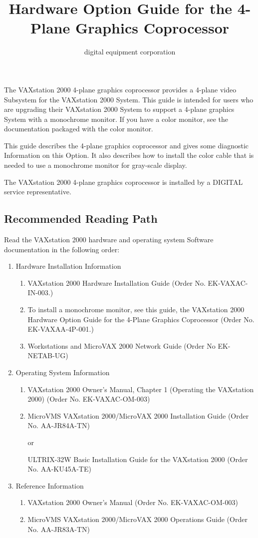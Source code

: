 \documentclass{dec}
\title{Hardware Option Guide for the 4-Plane Graphics Coprocessor}
\author{digital equipment corporation}
\begin{document}
\maketitle

\toc

\newpage
{}
\thispagestyle{preface}
The VAXstation 2000 4-plane graphics coprocessor provides a 4-plane video
Subsystem for the VAXstation 2000 System. This guide is intended for
users who are upgrading their VAXstation 2000 System to support a 4-plane
graphics System with a monochrome monitor. If you have a color monitor,
see the documentation packaged with the color monitor.

This guide describes the 4-plane graphics coprocessor and gives some
diagnostic Information on this Option. It also describes how to install the color
cable that is needed to use a monochrome monitor for gray-scale display.

The VAXstation 2000 4-plane graphics coprocessor is installed by a DIGITAL
service representative.

\subsection*{Recommended Reading Path}
Read the VAXstation 2000 hardware and operating system Software documentation in the following order:
\begin{enumerate}
	\item Hardware Installation Information
	\begin{enumerate}
		\item VAXstation 2000 Hardware Installation Guide (Order No. EK-VAXAC-IN-003.)
		\item To install a monochrome monitor, see this guide, the VAXstation 2000 Hardware Option Guide for the 4-Plane Graphics Coprocessor (Order No.  EK-VAXAA-4P-001.)
		\item Workstations and MicroVAX 2000 Network Guide (Order No EK-NETAB-UG)
	\end{enumerate}
	\item Operating System Information
	\begin{enumerate}
		\item VAXstation 2000 Owner's Manual, Chapter 1 (Operating the VAXstation 2000) (Order No. EK-VAXAC-OM-003)
		\item MicroVMS VAXstation 2000/MicroVAX 2000 Installation Guide (Order No. AA-JR84A-TN)

				or

				ULTRIX-32W Basic Installation Guide for the VAXstation 2000 (Order No. AA-KU45A-TE)
	\end{enumerate}
	\item Reference Information
	\begin{enumerate}
		\item VAXstation 2000 Owner's Manual (Order No. EK-VAXAC-OM-003)
		\item MicroVMS VAXstation 2000/MicroVAX 2000 Operations Guide (Order No. AA-JR83A-TN)
	\end{enumerate}
\end{enumerate}
\end{document}
